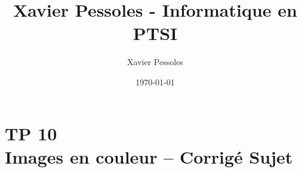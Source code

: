 \documentclass[
	fontsize=10pt, %
	twoside=true, %
]{kaobook}
\newcommand{\repRel}{../../../..}
\newcommand{\repStyle}{\repRel/Style}
\begin{document}

\titlehead{Xavier Pessoles - Informatique en PTSI}
\title[Xavier Pessoles - Informatique en PTSI]{Xavier Pessoles - Informatique en PTSI}
\author[XP]{Xavier Pessoles}
\date{\today}


\begingroup %
\endgroup

%
\mainmatter %
%
%
%
%


\setcounter{margintocdepth}{\sectiontocdepth}
\marginlayout
\graphicspath{{\repStyle/png}}

\pagestyle{xp.scrheadings}


%



\newcommand{\repExo}{}
\newcommand{\nomExo}{}

\livrettrue %
\livrettrue
\colletrue


\renewcommand{\repExo}{\repRel/Informatique/Exercices/S1_07_Images/}
\renewcommand{\nomExo}{05_ImagesCouleur}
\graphicspath{{\repStyle/png}{\repExo\nomExo/images}}


\chapter*{TP 10 \\ 
Images en couleur -- \ifprof Corrigé \else Sujet \fi}

\iflivret {} \else
\ifprof  {} \else \fi
\fi






%
% 
%
\end{document}
